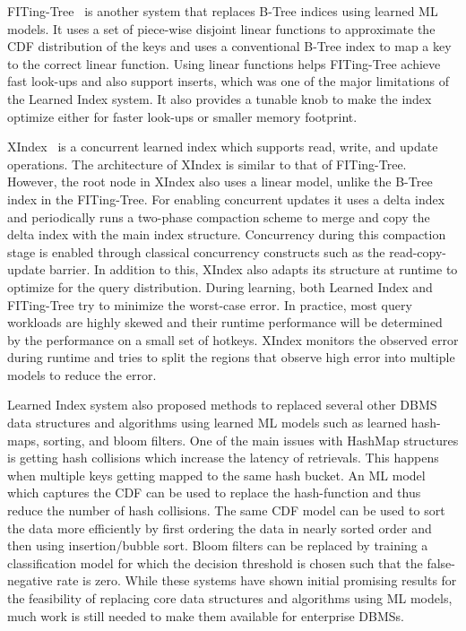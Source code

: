 FITing-Tree~\cite{fitingtree} is another system that replaces B-Tree indices using learned ML models.
It uses a set of piece-wise disjoint linear functions to approximate the CDF distribution of the keys and uses a conventional B-Tree index to map a key to the correct linear function.
Using linear functions helps FITing-Tree achieve fast look-ups and also support inserts, which was one of the major limitations of the Learned Index system.
It also provides a tunable knob to make the index optimize either for faster look-ups or smaller memory footprint.

XIndex~\cite{xindex} is a concurrent learned index which supports read, write, and update operations.
The architecture of XIndex is similar to that of FITing-Tree.
However, the root node in XIndex also uses a linear model, unlike the B-Tree index in the FITing-Tree.
For enabling concurrent updates it uses a delta index and periodically runs a two-phase compaction scheme to merge and copy the delta index with the main index structure.
Concurrency during this compaction stage is enabled through classical concurrency constructs such as the read-copy-update barrier.
In addition to this, XIndex also adapts its structure at runtime to optimize for the query distribution.
During learning, both Learned Index and FITing-Tree try to minimize the worst-case error.
In practice, most query workloads are highly skewed and their runtime performance will be determined by the performance on a small set of hotkeys.
XIndex monitors the observed error during runtime and tries to split the regions that observe high error into multiple models to reduce the error.

Learned Index system also proposed methods to replaced several other DBMS data structures and algorithms using learned ML models such as learned hash-maps, sorting, and bloom filters.
One of the main issues with HashMap structures is getting hash collisions which increase the latency of retrievals.
This happens when multiple keys getting mapped to the same hash bucket.
An ML model which captures the CDF can be used to replace the hash-function and thus reduce the number of hash collisions.
The same CDF model can be used to sort the data more efficiently by first ordering the data in nearly sorted order and then using insertion/bubble sort.
Bloom filters can be replaced by training a classification model for which the decision threshold is chosen such that the false-negative rate is zero.
While these systems have shown initial promising results for the feasibility of replacing core data structures and algorithms using ML models, much work is still needed to make them available for enterprise DBMSs.
